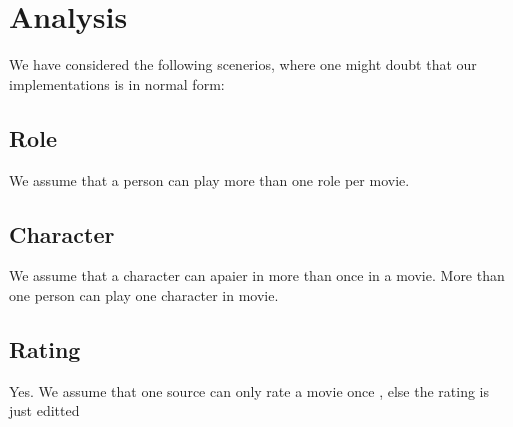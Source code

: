 \section{Analysis}
We have considered the following scenerios, where one might doubt that our implementations is in normal form: \\
\subsection{Role}
\begin{itemize}
          {We assume that a person can play more than one role per movie.}
\end{itemize}
\subsection{Character}
\begin{itemize}
          {We assume that a character can apaier in more than once in a movie.}
          {More than one person can play one character in movie.}
\end{itemize}
\subsection{Rating}
\begin{itemize}
          {Yes. We assume that one source can only rate a movie once , else the rating is just editted}
\end{itemize}

\newpage

